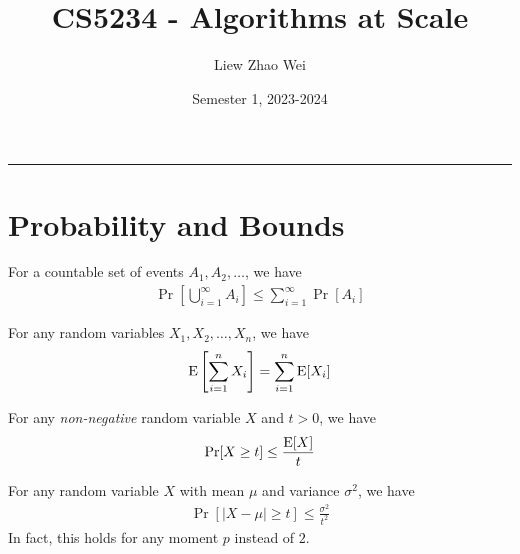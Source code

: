 \documentclass{article}
\title{CS5234 - Algorithms at Scale}
\author{Liew Zhao Wei}
\date{Semester 1, 2023-2024}
\begin{document}
\maketitle
\hrule

\section{Probability and Bounds}

\begin{lemma}
  For a countable set of events $A_1, A_2, \ldots$, we have
  \begin{align}
    \Pr\left[\bigcup_{i=1}^\infty A_i\right] \le \sum_{i=1}^\infty \Pr[A_i]
  \end{align}
\end{lemma}

\begin{lemma}
  For any random variables $X_1, X_2, \ldots, X_n$, we have
  \begin{align}
    \operatorname{E}\left[\sum_{i=1}^n X_i\right] = \sum_{i=1}^n \operatorname{E}[X_i]
  \end{align}
\end{lemma}

\begin{lemma}
  For any \emph{non-negative} random variable $X$ and $t > 0$, we have
  \begin{align}
    \Pr[X \ge t] \le \frac{\operatorname{E}[X]}{t}
  \end{align}
\end{lemma}

\begin{lemma}
  For any random variable $X$ with mean $\mu$ and variance $\sigma^2$, we have
  \begin{align}
    \Pr[|X - \mu| \ge t] \le \frac{\sigma^2}{t^2}
  \end{align}
  In fact, this holds for any moment $p$ instead of $2$.
\end{lemma}
\end{document}

